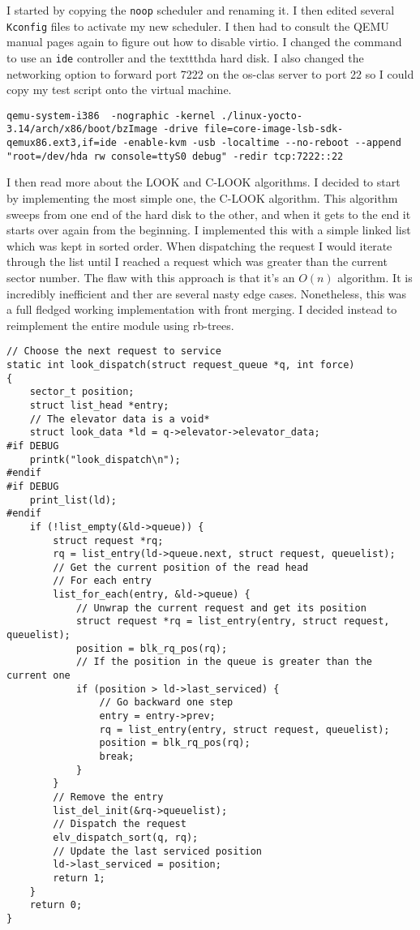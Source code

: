 \documentclass[10pt,conference,draftclsnofoot,onecolumn]{IEEEtran}
\begin{document}
I started by copying the \texttt{noop} scheduler and renaming it. I then edited several \texttt{Kconfig} files to activate my new scheduler. I then had to consult the QEMU manual pages again to figure out how to disable virtio. I changed the command to use an \texttt{ide} controller  and the texttt{hda} hard disk. I also changed the networking option to forward port 7222 on the os-clas server to port 22 so I could copy my test script onto the virtual machine\cite{qemu(1)}.

\begin{lstlisting}
qemu-system-i386  -nographic -kernel ./linux-yocto-3.14/arch/x86/boot/bzImage -drive file=core-image-lsb-sdk-qemux86.ext3,if=ide -enable-kvm -usb -localtime --no-reboot --append "root=/dev/hda rw console=ttyS0 debug" -redir tcp:7222::22
\end{lstlisting}

I then read more about the LOOK and C-LOOK algorithms. I decided to start by implementing the most simple one, the C-LOOK algorithm. This algorithm sweeps from one end of the hard disk to the other, and when it gets to the end it starts over again from the beginning. I implemented this with a simple linked list which was kept in sorted order. When dispatching the request I would iterate through the list until I reached a request which was greater than the current sector number. The flaw with this approach is that it's an $O(n)$ algorithm. It is incredibly inefficient and ther are several nasty edge cases. Nonetheless, this was a full fledged working implementation with front merging. I decided instead to reimplement the entire module using rb-trees.
\begin{lstlisting}
// Choose the next request to service
static int look_dispatch(struct request_queue *q, int force)
{
    sector_t position;
    struct list_head *entry;
    // The elevator data is a void*
    struct look_data *ld = q->elevator->elevator_data;
#if DEBUG
    printk("look_dispatch\n");
#endif
#if DEBUG
    print_list(ld);
#endif
    if (!list_empty(&ld->queue)) {
        struct request *rq;
        rq = list_entry(ld->queue.next, struct request, queuelist);
        // Get the current position of the read head
        // For each entry
        list_for_each(entry, &ld->queue) {
            // Unwrap the current request and get its position
            struct request *rq = list_entry(entry, struct request, queuelist);
            position = blk_rq_pos(rq);
            // If the position in the queue is greater than the current one
            if (position > ld->last_serviced) {
                // Go backward one step
                entry = entry->prev;
                rq = list_entry(entry, struct request, queuelist);
                position = blk_rq_pos(rq);
                break;
            }
        }
        // Remove the entry
        list_del_init(&rq->queuelist);
        // Dispatch the request
        elv_dispatch_sort(q, rq);
        // Update the last serviced position
        ld->last_serviced = position;
        return 1;
    }
    return 0;
}
\end{lstlisting}
\end{document}
